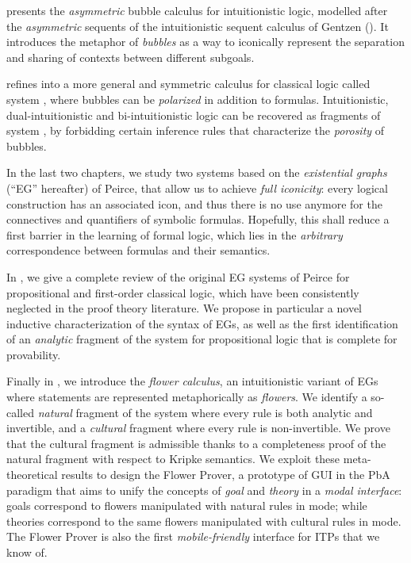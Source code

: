  presents the \emph{asymmetric} bubble calculus  for
intuitionistic logic, modelled after the \emph{asymmetric} sequents of the
intuitionistic sequent calculus  of Gentzen (). It
introduces the metaphor of \emph{bubbles} as a way to iconically represent the
separation and sharing of contexts between different subgoals.

 refines  into a more general and symmetric calculus
for classical logic called system , where bubbles can be \emph{polarized}
in addition to formulas. Intuitionistic, dual-intuitionistic and
bi-intuitionistic logic can be recovered as fragments of system , by
forbidding certain inference rules that characterize the \emph{porosity} of
bubbles.

In the last two chapters, we study two systems based on the \emph{existential
graphs} (``EG'' hereafter) of Peirce, that allow us to achieve \emph{full
iconicity}: every logical construction has an associated icon, and thus there is
no use anymore for the connectives and quantifiers of symbolic formulas.
Hopefully, this shall reduce a first barrier in the learning of formal logic,
which lies in the \emph{arbitrary} correspondence between formulas and their
semantics.

In , we give a complete review of the original EG systems of Peirce
for propositional and first-order classical logic, which have been consistently
neglected in the proof theory literature. We propose in particular a novel inductive
characterization of the syntax of EGs, as well as the first identification of an
\emph{analytic} fragment of the system for propositional logic that is complete
for provability.

Finally in , we introduce the \emph{flower calculus}, an
intuitionistic variant of EGs where statements are represented metaphorically as
\emph{flowers}. We identify a so-called \emph{natural} fragment of the system
where every rule is both analytic and invertible, and a \emph{cultural} fragment
where every rule is non-invertible. We prove that the cultural fragment is
admissible thanks to a completeness proof of the natural fragment with respect
to Kripke semantics. We exploit these meta-theoretical results to design the
Flower Prover, a prototype of GUI in the PbA paradigm that aims to unify the
concepts of \emph{goal} and \emph{theory} in a \emph{modal interface}: goals
correspond to flowers manipulated with natural rules in \Proof mode; while
theories correspond to the same flowers manipulated with cultural rules in \Edit
mode. The Flower Prover is also the first \emph{mobile-friendly} interface for
ITPs that we know of.

